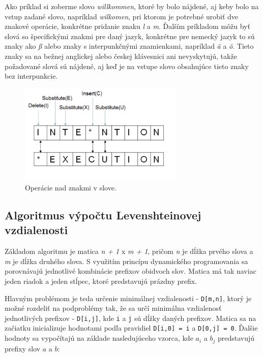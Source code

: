 \documentclass[
  digital, %
  table,   %
  lof,     %
  lot,     %
]{fithesis3}
\begin{document}
Ako príklad si zoberme slovo \textit{willkommen}, ktoré by bolo nájdené, aj keby bolo na vstup zadané slovo, napríklad \textit{wilkomen}, pri ktorom je potrebné urobiť dve znakové operácie, konkrétne pridanie znaku \textit{l} a \textit{m}. Ďalším príkladom môžu byť slová so špecifickými znakmi pre daný jazyk, konkrétne pre nemecký jazyk to sú znaky ako \textit{ß} alebo znaky s interpunkčnými znamienkami, napríklad \textit{ä} a \textit{ö}. Tieto znaky sa na bežnej anglickej alebo českej klávesnici ani nevyskytujú, takže požadované slová sú nájdené, aj keď je na vstupe slovo obsahujúce tieto znaky bez interpunkcie.

\begin{figure}
	\begin{center}
	\includegraphics[width=0.7\textwidth]{img/distance.png}
	\end{center}
    \caption{Operácie nad znakmi v slove.}
	\label{fig:levenshtein}
\end{figure}

\subsection{Algoritmus výpočtu Levenshteinovej vzdialenosti}
Základom algoritmu je matica \textit{n + 1} x \textit{m + 1}, pričom \textit{n} je dĺžka prvého slova a \textit{m} je dĺžka druhého slova. S využitím princípu dynamického programovania sa porovnávajú jednotlivé kombinácie prefixov obidvoch slov. Matica má tak naviac jeden riadok a jeden stĺpec, ktoré predstavujú prázdny prefix.

Hlavným problémom je teda určenie minimálnej vzdialenosti - \texttt{D[m,n]}, ktorý je možné rozdeliť na podproblémy tak, že sa určí minimálna vzdialenosť jednotlivých prefixov - \texttt{D[i,j]}, kde \texttt{i} a \texttt{j} sú dĺžky daných prefixov. Matica sa na začiatku inicializuje hodnotami podľa pravidiel \texttt{D[i,0] = i} a \texttt{D[0,j] = 0}. Ďalšie hodnoty sa vypočítajú na základe nasledujúceho vzorca, kde $a_i$ a $b_j$ predstavujú prefixy slov $a$ a $b$:
\end{document}
